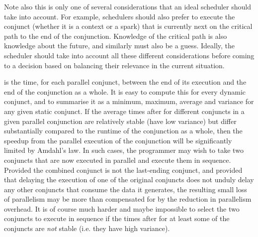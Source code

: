 Note also this is only one of several considerations
that an ideal scheduler should take into account.
For example, schedulers should also prefer to execute the conjunct
(whether it is a context or a spark)
that is currently next on the critical path to the end of the conjunction.
Knowledge of the critical path is also knowledge about the future,
and similarly must also be a guess.
Ideally, the scheduler should take into account
all these different considerations before coming to a decision
based on balancing their relevance in the current situation.




is the time, for each parallel conjunct,
between the end of its execution and the end of the conjunction as a whole.
It is easy to compute this for every dynamic conjunct,
and to summarise it as a minimum, maximum, average and variance
for any given static conjunct.
If the average times after
for different conjuncts in a given parallel conjunction
are relatively stable (have low variance)
but differ substantially compared to the runtime of the conjunction as a whole,
then the speedup from the parallel execution of the conjunction
will be significantly limited by Amdahl's law.
In such cases, the programmer may wish to take
two conjuncts that are now executed in parallel
and execute them in sequence.
Provided the combined conjunct is not the last-ending conjunct,
and provided that delaying the execution of one of the original conjuncts
does not unduly delay any other conjuncts that consume the data it generates,
the resulting small loss of parallelism
may be more than compensated for
by the reduction in parallelism overhead.
It is of course much harder and maybe impossible
to select the two conjuncts to execute in sequence
if the times after for at least some of the conjuncts
are \emph{not} stable (i.e. they have high variance).

